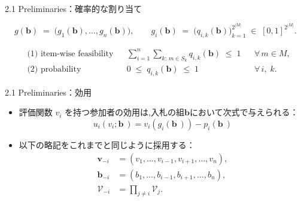 \documentclass[dvipdfmx,autodetect-engine]{beamer}
\begin{document}
\begin{frame}{2.1  Preliminaries：確率的な割り当て}
\newcommand{\numS}{2^{|M|}}        %
\newcommand{\Sk}{S_k}              %
\newcommand{\Sik}{S_{i,k}}         %
\newcommand{\qik}{q_{i,k}(\mathbf{b})} %

\[
  g(\mathbf{b})
  \;=\;
  \bigl(
    g_1(\mathbf{b}),
    \dots,
    g_n(\mathbf{b})
  \bigr),
  \qquad
  g_i(\mathbf{b})
  \;=\;
  \bigl(
    \qik
  \bigr)_{k=1}^{\numS}
  \;\in\;
  [0,1]^{\numS}.
\]


\[
  \boxed{
  \begin{aligned}
    &\text{(1) item-wise feasibility} &
      &\sum_{i=1}^{n}\sum_{k:\,m\in\Sk} \qik \;\le\; 1
      &&\forall\,m\in M, \\[6pt]
    &\text{(2) probability} &
      &0 \;\le\; \qik \;\le\; 1
      &&\forall\,i,\;k.
  \end{aligned}
  }
\]
\end{frame}


\begin{frame}{2.1  Preliminaries：効用}
  \small
  \begin{itemize}
    \item 評価関数 $v_i$ を持つ参加者の効用は,入札の組\(\mathbf{b}\)において次式で与えられる：
    \[
    u_i(v_i;\mathbf{b}\ ) = v_i(g_i(\mathbf{b}\ )) - p_i(\mathbf{b}\ )
    \]
    \item 以下の略記をこれまでと同じように採用する：
    \begin{align*}
    \mathbf{v}_{-i}           &= (v_1,\ldots,v_{i-1},v_{i+1},\ldots,v_n),\\
    \mathbf{b}_{-i}           &= (b_1,\ldots,b_{i-1},b_{i+1},\ldots,b_n),\\
    \mathcal{V}_{-i} &= \prod_{j\neq i}\mathcal{V}_j.
\end{align*}
  \end{itemize}
\end{frame}
\end{document}
